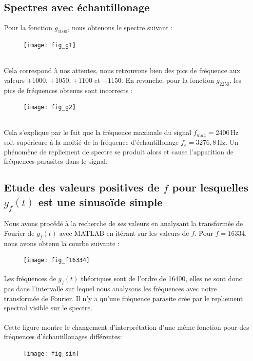 \documentclass{article}
\begin{document}
\subsection{Spectres avec échantillonage}
Pour la fonction $g_{1000}$, nous obtenons le spectre suivant :
\begin{figure}[h]
\texttt{[image: fig\_g1]}
\centering
\end{figure} \\
Cela correspond à nos attentes, nous retrouvons bien des pics de fréquence aux valeurs $\pm1000$, $\pm1050$, $\pm1100$ et $\pm1150$.
En revanche, pour la fonction $g_{2250}$, les pics de fréquences obtenus sont incorrects :
\begin{figure}[h]
\texttt{[image: fig\_g2]}
\centering
\end{figure} \\
Cela s'explique par le fait que la fréquence maximale du signal $f_{max}=2400\,\mathrm{Hz}$ soit supérieure à la moitié de la fréquence d'échantillonage $f_e=3276,8 \,\mathrm{Hz}$. Un phénomène de repliement de spectre se produit alors et cause l'apparition de fréquences parasites dans le signal.
\newpage

\subsection{Etude des valeurs positives de $f$ pour lesquelles $g_f(t)$ est une sinusoïde simple}
Nous avons procédé à la recherche de ses valeurs en analysant la transformée de Fourier de $g_f(t)$ avec MATLAB en itérant sur les valeurs de $f$.
Pour $f=16334$, nous avons obtenu la courbe suivante :
\begin{figure}[h]
\texttt{[image: fig\_f16334]}
\centering
\end{figure}
\paragraph{}
Les fréquences de $g_f(t)$ théoriques sont de l'ordre de 16400, elles ne sont donc pas dans l'intervalle sur lequel nous analysons les fréquences avec notre transformée de Fourier. Il n'y a qu'une fréquence parasite crée par le repliement spectral visible sur le spectre.
\paragraph{}
Cette figure montre le changement d'interprétation d'une même fonction pour des fréquences d'échantillonages différentes:
\begin{figure}[h]
\texttt{[image: fig\_sin]}
\centering
\end{figure}
\end{document}
